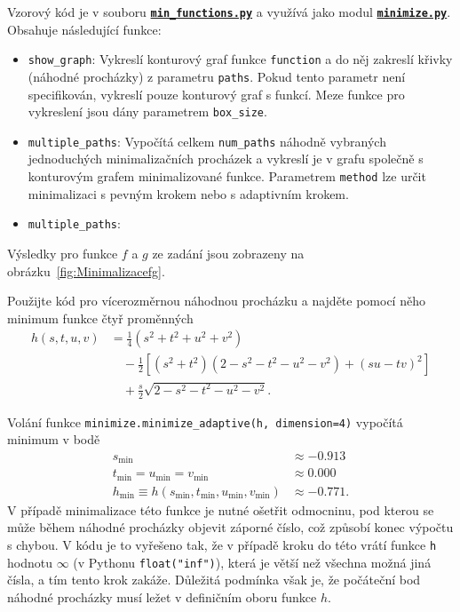 \documentclass[a4paper,11pt,twoside]{article}
\def\code#1{\textnormal{\texttt{#1}}}
\def\ghfile#1#2{\textnormal{\textbf{\texttt{\href{https://github.com/PavelStransky/PCInPhysics/blob/main/#1#2}{#2}}}}}
\theoremstyle{red}
\theoremstyle{green}
\begin{document}
\begin{solution}
    Vzorový kód je v souboru \ghfile{python/minimize/}{min_functions.py} a využívá jako modul \ghfile{python/minimize/}{minimize.py}.
    Obsahuje následující funkce:
    \begin{itemize}
        \item \code{show_graph}: 
            Vykreslí konturový graf funkce \code{function} a do něj zakreslí křivky (náhodné procházky) z parametru \code{paths}.
            Pokud tento parametr není specifikován, vykreslí pouze konturový graf s funkcí.
            Meze funkce pro vykreslení jsou dány parametrem \code{box_size}.

        \item \code{multiple_paths}:
            Vypočítá celkem \code{num_paths} náhodně vybraných jednoduchých minimalizačních procházek a vykreslí je v grafu společně s konturovým grafem minimalizované funkce.
            Parametrem \code{method} lze určit minimalizaci s pevným krokem nebo s adaptivním krokem.
        \item \code{multiple_paths}:
    \end{itemize}

    Výsledky pro funkce $f$ a $g$ ze zadání jsou zobrazeny na obrázku~\ref{fig:Minimalizacefg}.
\end{solution}

\begin{solved}
    Použijte kód pro vícerozměrnou náhodnou procházku a najděte pomocí něho minimum funkce čtyř proměnných
    \begin{align}
        h(s,t,u,v)
            &=\frac{1}{4}\left(s^{2}+t^{2}+u^{2}+v^{2}\right)\nonumber\\
            &\quad-\frac{1}{2}\left[\left(s^{2}+t^{2}\right)\left(2-s^{2}-t^{2}-u^{2}-v^{2}\right)+\left(su-tv\right)^{2}\right]\\
            &\quad+\frac{s}{2}\sqrt{2-s^{2}-t^{2}-u^{2}-v^{2}}\nonumber.
        \end{align}
\end{solved}

\begin{solution}
    Volání funkce \code{minimize.minimize_adaptive(h, dimension=4)} vypočítá minimum v bodě
    \begin{align}
        s_{\text{min}}&\approx-0.913\nonumber\\
        t_{\text{min}}=u_{\text{min}}=v_{\text{min}}&\approx0.000\\
        h_{\text{min}}\equiv h(s_{\text{min}},t_{\text{min}},u_{\text{min}},v_{\text{min}})&\approx-0.771.\nonumber
    \end{align}
    V případě minimalizace této funkce je nutné ošetřit odmocninu, pod kterou se může během náhodné procházky objevit záporné číslo, což způsobí konec výpočtu s chybou.
    V kódu je to vyřešeno tak, že v případě kroku do této  vrátí funkce \code{h} hodnotu $\infty$ (v Pythonu \code{float("inf")}), která je větší než všechna možná jiná čísla, a tím tento krok zakáže.
    Důležitá podmínka však je, že počáteční bod náhodné procházky musí ležet v definičním oboru funkce $h$.
\end{solution}
\end{document}

